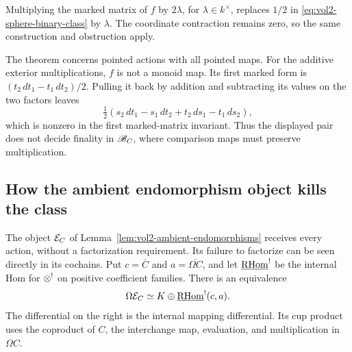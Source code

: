 Multiplying the marked matrix of $f$ by $2\lambda$, for
$\lambda\in k^\times$, replaces $1/2$ in
\eqref{eq:vol2-sphere-binary-class} by $\lambda$.
The coordinate contraction remains zero, so the same construction
and obstruction apply.

The theorem concerns pointed actions with all pointed maps.
For the additive exterior multiplications, $f$ is not a monoid map.
Its first marked form is $(t_2\,dt_1-t_1\,dt_2)/2$.
Pulling it back by addition and subtracting its values on the two
factors leaves
\[
 \tfrac12(s_2\,dt_1-s_1\,dt_2+t_2\,ds_1-t_1\,ds_2),
\]
which is nonzero in the first marked-matrix invariant.
Thus the displayed pair does not decide finality in $\mathscr B_C$,
where comparison maps must preserve multiplication.

\subsection{How the ambient endomorphism object kills the class}

The object $\mathcal E_C$ of Lemma~\ref{lem:vol2-ambient-endomorphisms}
receives every action, without a factorization requirement.
Its failure to factorize can be seen directly in its cochains.
Put $c=\overline C$ and $a=\overline{\Omega C}$, and let
$\underline{\operatorname{RHom}}^{!}$ be the internal Hom for $\mathbin{\otimes^!}$ on positive
coefficient families. There is an equivalence
\begin{equation}\label{eq:vol2-internal-action-cochains}
 \Omega\mathcal E_C\simeq K\oplus\underline{\operatorname{RHom}}^{!}(c,a).
\end{equation}
The differential on the right is the internal mapping
differential. Its cup product uses the coproduct of $C$,
the interchange map, evaluation, and multiplication in $\Omega C$.

